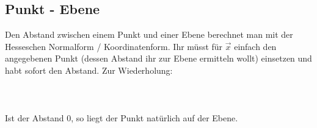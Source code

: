 \subsection{Punkt - Ebene}
	Den Abstand zwischen einem Punkt und einer Ebene berechnet man mit der
	Hesseschen Normalform / Koordinatenform. Ihr müsst für \(\vec{x}\) einfach den
	angegebenen Punkt (dessen Abstand ihr zur Ebene ermitteln wollt) einsetzen und
	habt sofort den Abstand. Zur Wiederholung:
	\\ \\
	\formel{\[d=(\vec{a}-\vec{x})\cdot \hat{n} \mathrm{\ bzw\ }
	d=\frac{n_1x_1+n_2x_2+n_3x_3-w}{|\vec{n}|}\]}
	\\ \\
	Ist der Abstand 0, so liegt der Punkt natürlich auf der Ebene.
